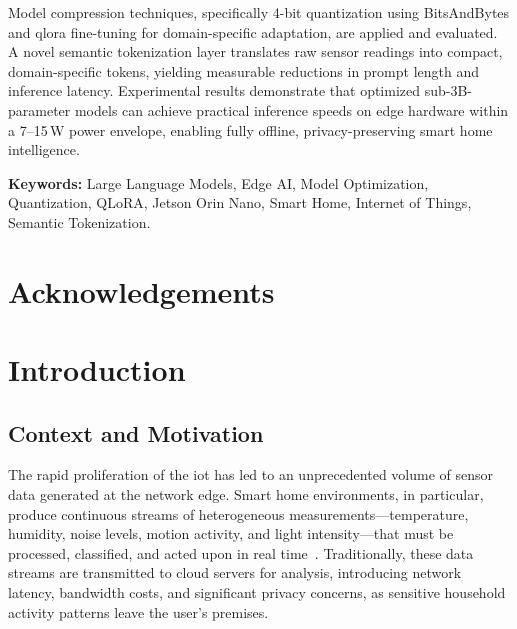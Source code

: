 \documentclass[12pt,a4paper,oneside]{report}
\begin{document}
Model compression techniques, specifically 4-bit quantization using BitsAndBytes and \gls{qlora} fine-tuning for domain-specific adaptation, are applied and evaluated. A novel semantic tokenization layer translates raw sensor readings into compact, domain-specific tokens, yielding measurable reductions in prompt length and inference latency. Experimental results demonstrate that optimized sub-3B-parameter models can achieve practical inference speeds on edge hardware within a 7--15\,W power envelope, enabling fully offline, privacy-preserving smart home intelligence.

\textbf{Keywords:} Large Language Models, Edge AI, Model Optimization, Quantization, QLoRA, Jetson Orin Nano, Smart Home, Internet of Things, Semantic Tokenization.

\chapter*{Acknowledgements}


\tableofcontents
\listoffigures
\listoftables
\printglossary[type=\acronymtype,title=List of Acronyms]

\clearpage
{}

\chapter{Introduction}
\label{ch:introduction}


\section{Context and Motivation}
\label{sec:intro-context}

The rapid proliferation of the \gls{iot} has led to an unprecedented volume of sensor data generated at the network edge. Smart home environments, in particular, produce continuous streams of heterogeneous measurements---temperature, humidity, noise levels, motion activity, and light intensity---that must be processed, classified, and acted upon in real time~\cite{stojkoska2017review}. Traditionally, these data streams are transmitted to cloud servers for analysis, introducing network latency, bandwidth costs, and significant privacy concerns, as sensitive household activity patterns leave the user's premises.
\end{document}
